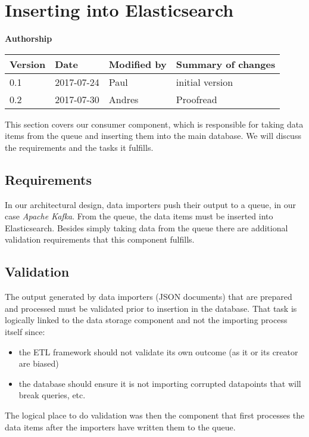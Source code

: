 \section{Inserting into Elasticsearch}\label{sec:inserting}

\textbf{Authorship}

\begin{longtable}[]{@{}llll@{}}
\toprule
Version & Date & Modified by & Summary of changes\tabularnewline
\midrule
\endhead
0.1 & 2017-07-24 & Paul & initial version\tabularnewline
0.2 & 2017-07-30 & Andres & Proofread\tabularnewline
\bottomrule
\end{longtable}

This section covers our consumer component, which is responsible for
taking data items from the queue and inserting them into the main
database. We will discuss the requirements and the tasks it fulfills.

\subsection{Requirements}\label{requirements}

In our architectural design, data importers push their output to a
queue, in our case \emph{Apache Kafka}. From the queue, the data items
must be inserted into Elasticsearch. Besides simply taking data from the
queue there are additional validation requirements that this component
fulfills.

\subsection{Validation}\label{validation}

The output generated by data importers (JSON documents) that are
prepared and processed must be validated prior to insertion in the
database. That task is logically linked to the data storage component
and not the importing process itself since:

\begin{itemize}
\tightlist
\item
  the ETL framework should not validate its own outcome (as it or its
  creator are biased)
\item
  the database should ensure it is not importing corrupted datapoints
  that will break queries, etc.
\end{itemize}

The logical place to do validation was then the component that first
processes the data items after the importers have written them to the
queue.

